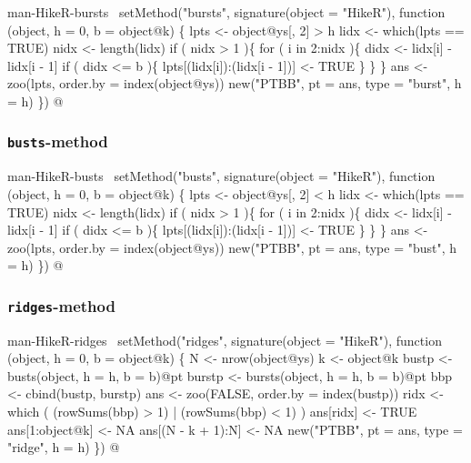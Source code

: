 \documentclass[a4paper]{article}
\begin{document}
\nwenddocs{}\endmoddef
\LA{}man-HikeR-bursts~{\nwtagstyle{}}\RA{}
setMethod("bursts",
    signature(object = "HikeR"),
    function (object, h = 0, b = object@k) \{
        lpts <- object@ys[, 2] > h
        lidx <- which(lpts == TRUE)
        nidx <- length(lidx)
        if ( nidx > 1 )\{
            for ( i in 2:nidx )\{
                didx <- lidx[i] - lidx[i - 1]
                if ( didx <= b )\{
                    lpts[(lidx[i]):(lidx[i - 1])] <- TRUE
                \}
            \}
        \}
        ans <- zoo(lpts, order.by = index(object@ys))
        new("PTBB", pt = ans, type = "burst", h = h)
\})
\nwendcode{}@

\subsubsection{\texttt{busts}-method}

\nwenddocs{}\endmoddef
\LA{}man-HikeR-busts~{\nwtagstyle{}}\RA{}
setMethod("busts",
    signature(object = "HikeR"),
    function (object, h = 0, b = object@k) \{
        lpts <- object@ys[, 2] < h
        lidx <- which(lpts == TRUE)
        nidx <- length(lidx)
        if ( nidx > 1 )\{
            for ( i in 2:nidx )\{
                didx <- lidx[i] - lidx[i - 1]
                if ( didx <= b )\{
                    lpts[(lidx[i]):(lidx[i - 1])] <- TRUE
                \}
            \}
        \}
        ans <- zoo(lpts, order.by = index(object@ys))
        new("PTBB", pt = ans, type = "bust", h = h)
\})
\nwendcode{}@

\subsubsection{\texttt{ridges}-method}

\nwenddocs{}\endmoddef
\LA{}man-HikeR-ridges~{\nwtagstyle{}}\RA{}
setMethod("ridges",
    signature(object = "HikeR"),
    function (object, h = 0, b = object@k) \{
        N <- nrow(object@ys)
        k <- object@k
        bustp <- busts(object, h = h, b = b)@pt
        burstp <- bursts(object, h = h, b = b)@pt
        bbp <- cbind(bustp, burstp)
        ans <- zoo(FALSE, order.by = index(bustp))
        ridx <- which ( (rowSums(bbp) > 1) | (rowSums(bbp) < 1) )
        ans[ridx] <- TRUE
        ans[1:object@k] <- NA
        ans[(N - k + 1):N] <- NA
        new("PTBB", pt = ans, type = "ridge", h = h)
\})
\nwendcode{}@
\end{document}
